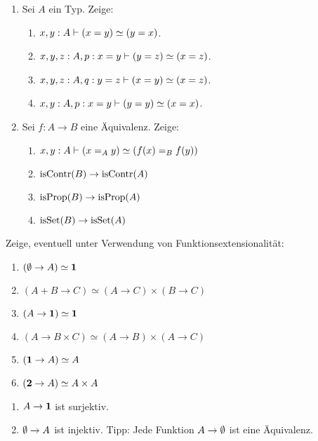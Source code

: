 \documentclass{uebung}
\begin{document}
\begin{exercise}
  \begin{enumerate}
    \item Sei $A$ ein Typ.
      Zeige:
        \begin{enumerate}
          \item $x,y:A \vdash (x=y) \simeq (y=x)$.
          \item $x,y,z:A,p:x=y \vdash (y=z) \simeq (x=z)$.
          \item $x,y,z:A,q:y=z \vdash (x=y) \simeq (x=z)$.
          \item $x,y:A,p:x=y \vdash (y=y) \simeq (x=x)$.
        \end{enumerate}

    \item Sei $f:A\to B$ eine Äquivalenz.
      Zeige:
        \begin{enumerate}
          \item $x,y:A\vdash (x =_A y)\simeq (f(x) =_B f(y))$
          \item $\mathrm{isContr}(B)\to\mathrm{isContr}(A)$
          \item $\mathrm{isProp}(B)\to\mathrm{isProp}(A)$
          \item $\mathrm{isSet}(B)\to\mathrm{isSet}(A)$
        \end{enumerate}
  \end{enumerate}
\end{exercise}

\begin{exercise}
  Zeige, eventuell unter Verwendung von Funktionsextensionalität:
  \begin{multicols}{2}
  \begin{enumerate}
    \item $(\emptyset \to A) \simeq \mathbf{1}$
    \item $(A+B\to C) \simeq (A \to C) \times (B \to C)$
    \item $(A \to \mathbf{1}) \simeq \mathbf{1}$
    \item $(A \to B\times C) \simeq (A \to B) \times (A \to C)$
    \item $(\mathbf{1} \to A)\simeq A$
    \item $(\mathbf{2} \to A)\simeq A\times A$
  \end{enumerate}
  \end{multicols}
\end{exercise}

\begin{bonus}
  \begin{enumerate}
    \item $A\to\mathbf{1}$ ist surjektiv.
    \item $\emptyset\to A$ ist injektiv.
      {\tiny Tipp: Jede Funktion $A\to\emptyset$ ist eine Äquivalenz.}
  \end{enumerate}
\end{bonus}
\end{document}
